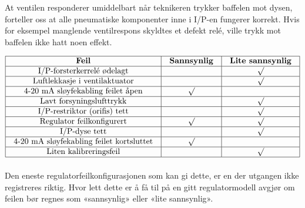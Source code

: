 





At ventilen responderer umiddelbart når teknikeren trykker baffelen mot dysen, forteller oss at alle pneumatiske komponenter inne i I/P-en fungerer korrekt. Hvis for eksempel manglende ventilrespons skyldtes et defekt relé, ville trykk mot baffelen ikke hatt noen effekt.


$$\vbox{\offinterlineskip
\halign{\strut
\vrule \quad\hfil # \ \hfil &
\vrule \quad\hfil # \ \hfil &
\vrule \quad\hfil # \ \hfil \vrule \cr
\noalign{\hrule}
%
{\bf Feil} & {\bf Sannsynlig} & {\bf Lite sannsynlig} \cr
%
\noalign{\hrule}
%
I/P-forsterkerrelé ødelagt &  & $\surd$ \cr
%
\noalign{\hrule}
%
Luftlekkasje i ventilaktuator &  & $\surd$ \cr
%
\noalign{\hrule}
%
4-20 mA sløyfekabling feilet åpen & $\surd$ & \cr
%
\noalign{\hrule}
%
Lavt forsyningslufttrykk &  & $\surd$ \cr
%
\noalign{\hrule}
%
I/P-restriktor (orifis) tett &  & $\surd$ \cr
%
\noalign{\hrule}
%
Regulator feilkonfigurert & $\surd$ & $\surd$ \cr
%
\noalign{\hrule}
%
I/P-dyse tett &  & $\surd$ \cr
%
\noalign{\hrule}
%
4-20 mA sløyfekabling feilet kortsluttet & $\surd$ & \cr
%
\noalign{\hrule}
%
Liten kalibreringsfeil &  & $\surd$ \cr
%
\noalign{\hrule}
} %
}$$ %

Den eneste regulatorfeilkonfigurasjonen som kan gi dette, er en der utgangen ikke registreres riktig. Hvor lett dette er å få til på en gitt regulatormodell avgjør om feilen bør regnes som «sannsynlig» eller «lite sannsynlig».





